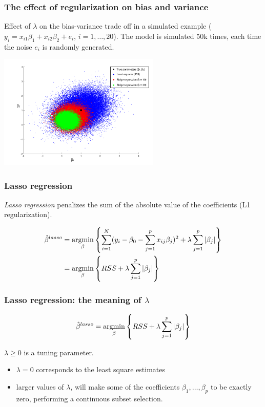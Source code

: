 \documentclass[notes]{beamer}          %
\newcommand{\argmin}{\operatornamewithlimits{argmin}}
\begin{document}
\begin{frame}
\frametitle{The effect of regularization on bias and variance}
Effect of $\lambda$ on the bias-variance trade off in a simulated example ($y_i = x_{i1}\beta_1 + x_{i2}\beta_2 + e_i$, $i=1,\dots, 20$). The model is simulated 50k times, each time the noise $e_i$ is randomly generated.




\begin{center}
\includegraphics[height=5.5cm]{../figures/week_2_linear_models/Ridge_bias_variance_insilico.pdf}
\end{center}

\end{frame}


\begin{frame}
\frametitle{Lasso regression}
\textit{Lasso regression} penalizes the sum of the absolute value of the coefficients (L1 regularization). 

\begin{align*}
\hat{\beta}^{lasso} &= \argmin_{\beta} \left\{ \sum_{i=1}^N (y_i - \beta_0 -  \sum_{j=1}^p x_{ij}\beta_j)^2 + \lambda \sum_{j=1}^p | \beta_j | \right\} \\
& =  \argmin_{\beta} \left\{ RSS + \lambda \sum_{j=1}^p | \beta_j | \right\}
\end{align*}

\end{frame}


\begin{frame}
\frametitle{Lasso regression: the meaning of $\lambda$}

\begin{equation*}
    \hat{\beta}^{lasso} =  \argmin_{\beta} \left\{ RSS + \lambda \sum_{j=1}^p | \beta_j | \right\}
\end{equation*}

$\lambda \geq 0$ is a tuning parameter.

\begin{itemize}
    \item $\lambda = 0$ corresponds to the least square estimates
    \item larger values of $\lambda$, will make some of the coefficients $\beta_1, \dots, \beta_p$ to be exactly zero, performing a continuous subset selection.
\end{itemize}
\end{frame}
\end{document}
